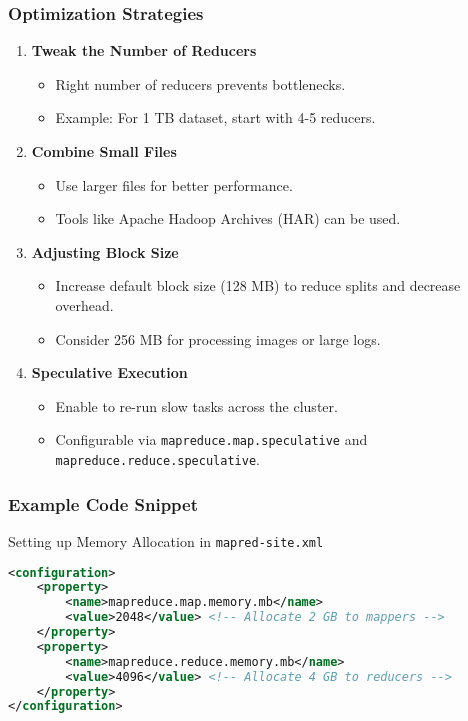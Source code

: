 \documentclass[aspectratio=169]{beamer}
\begin{document}
\begin{frame}[fragile]
    \frametitle{Optimization Strategies}
    \begin{enumerate}
        \item \textbf{Tweak the Number of Reducers}
        \begin{itemize}
            \item Right number of reducers prevents bottlenecks.
            \item Example: For 1 TB dataset, start with 4-5 reducers.
        \end{itemize}
        \item \textbf{Combine Small Files}
        \begin{itemize}
            \item Use larger files for better performance. 
            \item Tools like Apache Hadoop Archives (HAR) can be used.
        \end{itemize}
        \item \textbf{Adjusting Block Size}
        \begin{itemize}
            \item Increase default block size (128 MB) to reduce splits and decrease overhead.
            \item Consider 256 MB for processing images or large logs.
        \end{itemize}
        \item \textbf{Speculative Execution}
        \begin{itemize}
            \item Enable to re-run slow tasks across the cluster.
            \item Configurable via \texttt{mapreduce.map.speculative} and \texttt{mapreduce.reduce.speculative}.
        \end{itemize}
    \end{enumerate}
\end{frame}

\begin{frame}[fragile]
    \frametitle{Example Code Snippet}
    \begin{block}{Setting up Memory Allocation in \texttt{mapred-site.xml}}
    \begin{lstlisting}[language=XML]
<configuration>
    <property>
        <name>mapreduce.map.memory.mb</name>
        <value>2048</value> <!-- Allocate 2 GB to mappers -->
    </property>
    <property>
        <name>mapreduce.reduce.memory.mb</name>
        <value>4096</value> <!-- Allocate 4 GB to reducers -->
    </property>
</configuration>
    \end{lstlisting}
    \end{block}
\end{frame}
\end{document}
